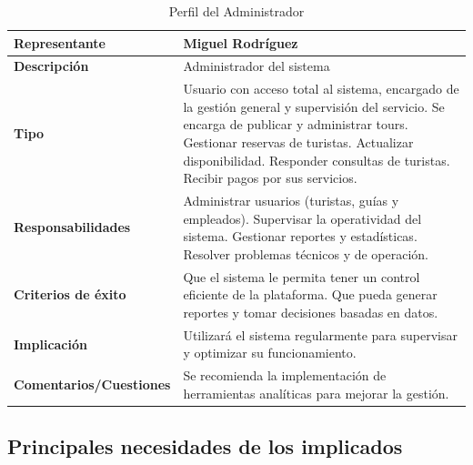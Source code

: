 \begin{table}[H]
\centering
\begin{tabular}{|p{5cm}|p{10cm}|}
\hline
\rowcolor[HTML]{CFE2F3} 
\textbf{Representante} & Miguel Rodríguez \\ \hline
\textbf{Descripción} & Administrador del sistema \\ \hline
\textbf{Tipo} & Usuario con acceso total al sistema, encargado de la gestión general y supervisión del servicio. Se encarga de publicar y administrar tours. Gestionar reservas de turistas. Actualizar disponibilidad. Responder consultas de turistas. Recibir pagos por sus servicios.\\ \hline
\textbf{Responsabilidades} & Administrar usuarios (turistas, guías y empleados). Supervisar la operatividad del sistema. Gestionar reportes y estadísticas. Resolver problemas técnicos y de operación. \\ \hline
\textbf{Criterios de éxito} & Que el sistema le permita tener un control eficiente de la plataforma. Que pueda generar reportes y tomar decisiones basadas en datos. \\ \hline
\textbf{Implicación} & Utilizará el sistema regularmente para supervisar y optimizar su funcionamiento. \\ \hline
\textbf{Comentarios/Cuestiones} & Se recomienda la implementación de herramientas analíticas para mejorar la gestión. \\ \hline
\end{tabular}
\caption{Perfil del Administrador}
\label{tab:perfil_administrador}
\end{table}

\subsection*{Principales necesidades de los implicados}

